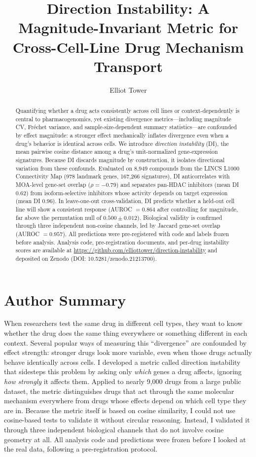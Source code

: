 \documentclass[11pt]{article}
\title{Direction Instability: A Magnitude-Invariant Metric for Cross-Cell-Line Drug Mechanism Transport}
\author{Elliot Tower}
\affil{Independent researcher \\ \texttt{elliot@elliottower.ai}}
\date{}
\begin{document}
\maketitle

\begin{abstract}
Quantifying whether a drug acts consistently across cell lines or
context-dependently is central to pharmacogenomics, yet existing
divergence metrics---including magnitude CV, Fr\'echet variance, and
sample-size-dependent summary statistics---are confounded by effect
magnitude: a stronger effect mechanically inflates divergence even when a
drug's behavior is identical across cells.  We introduce
\emph{direction instability} (DI), the mean pairwise cosine distance
among a drug's unit-normalized gene-expression signatures.  Because DI
discards magnitude by construction, it isolates directional variation
from these confounds.  Evaluated on 8{,}949 compounds from the LINCS
L1000 Connectivity Map (978 landmark genes, 167{,}266 signatures), DI
anticorrelates with MOA-level gene-set overlap ($\rho = -0.79$) and
separates pan-HDAC inhibitors (mean DI 0.62) from isoform-selective
inhibitors whose activity depends on target expression (mean DI 0.96).
In leave-one-out cross-validation, DI predicts whether a held-out cell
line will show a consistent response (AUROC $= 0.864$ after controlling
for magnitude, far above the permutation null of $0.500 \pm 0.012$).
Biological validity is confirmed through three independent non-cosine
channels, led by Jaccard gene-set overlap (AUROC $= 0.957$).  All
predictions were pre-registered with code and labels frozen before
analysis.  Analysis code, pre-registration documents, and per-drug
instability scores are available at
\url{https://github.com/elliottower/direction-instability} and deposited
on Zenodo (DOI: 10.5281/zenodo.21213700).
\end{abstract}

\section*{Author Summary}
When researchers test the same drug in different cell types, they want to
know whether the drug does the same thing everywhere or something
different in each context.  Several popular ways of measuring this
``divergence'' are confounded by effect strength: stronger drugs
look more variable, even when those drugs actually behave identically
across cells.  I developed a metric called direction instability that
sidesteps this problem by asking only \emph{which} genes a drug affects,
ignoring \emph{how strongly} it affects them.  Applied to nearly 9{,}000
drugs from a large public dataset, the metric distinguishes
drugs that act through the same molecular mechanism everywhere from drugs
whose effects depend on which cell type they are in.  Because the metric
itself is based on cosine similarity, I could not use cosine-based tests
to validate it without circular reasoning.  Instead, I validated it
through three independent biological channels that do not involve cosine
geometry at all.  All analysis code and predictions were frozen before
I looked at the real data, following a pre-registration protocol.
\end{document}
